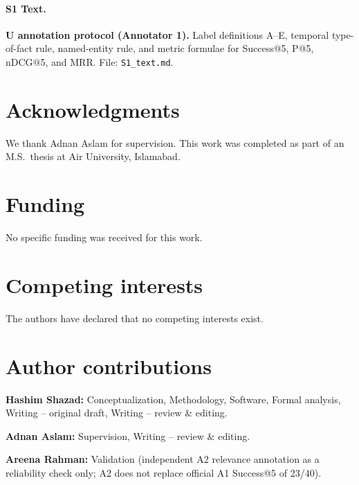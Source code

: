 \documentclass[10pt,letterpaper]{article}
\begin{document}
\paragraph*{S1 Text.}
\label{S1_Text}
\textbf{U annotation protocol (Annotator 1).} Label definitions A--E, temporal type-of-fact rule, named-entity rule, and metric formulae for Success@5, P@5, nDCG@5, and MRR. File: \texttt{S1\_text.md}.

\section*{Acknowledgments}

We thank Adnan Aslam for supervision. This work was completed as part of an M.S.\ thesis at Air University, Islamabad.

\section*{Funding}

No specific funding was received for this work.

\section*{Competing interests}

The authors have declared that no competing interests exist.

\section*{Author contributions}

\textbf{Hashim Shazad:} Conceptualization, Methodology, Software, Formal analysis, Writing -- original draft, Writing -- review \& editing.

\textbf{Adnan Aslam:} Supervision, Writing -- review \& editing.

\textbf{Areena Rahman:} Validation (independent A2 relevance annotation as a reliability check only; A2 does not replace official A1 Success@5 of 23/40).

\nolinenumbers



\end{document}
